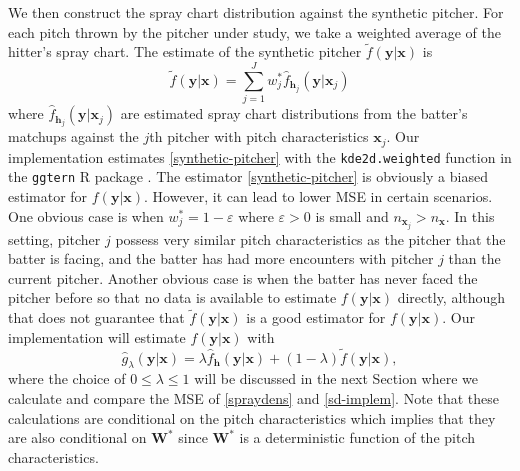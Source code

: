 \documentclass[11pt]{article}
\newcommand{\R}{\mathbb{R}}
\newcommand{\Xbf}{\textbf{X}}
\newcommand{\V}{\textbf{V}}
\newcommand{\W}{\textbf{W}}
\newcommand{\y}{\textbf{y}}
\newcommand{\x}{\textbf{x}}
\newcommand{\h}{\textbf{h}}
\newcommand{\Wstar}{\W^{\textstyle{*}}}
\newcommand{\wstar}{w^{\textstyle{*}}}
\begin{document}



We then construct the spray chart distribution against the synthetic pitcher. For each pitch thrown by the pitcher under study, we take a weighted average of the hitter's spray chart. The estimate of the synthetic pitcher $\tilde{f}(\y|\x)$ is  
\begin{equation} \label{synthetic-pitcher}
  \tilde{f}(\y|\x) = \sum_{j=1}^J \wstar_j\hat{f}_{\h_j}(\y|\x_j)
\end{equation}
where $\hat{f}_{\h_j}(\y|\x_j)$ are estimated spray chart distributions from the batter's matchups against the $j$th pitcher with pitch characteristics $\x_j$. Our implementation estimates \eqref{synthetic-pitcher} with the \texttt{kde2d.weighted} function in the \texttt{ggtern} R package \citep{ggtern}. The estimator \eqref{synthetic-pitcher} is obviously a biased estimator for $f(\y|\x)$. However, it can lead to lower MSE in certain scenarios. One obvious case is when $\wstar_j = 1 - \varepsilon$ where $\varepsilon > 0$ is small and $n_{\x_j} > n_{\x}$. In this setting, pitcher $j$ possess very similar pitch characteristics as the pitcher that the batter is facing, and the batter has had more encounters with pitcher $j$ than the current pitcher. Another obvious case is when the batter has never faced the pitcher before so that no data is available to estimate $f(\y|\x)$ directly, although that does not guarantee that $\tilde{f}(\y|\x)$ is a good estimator for $f(\y|\x)$. Our implementation will estimate $f(\y|\x)$ with
\begin{equation} \label{sd-implem}
  \hat{g}_{\lambda}(\y|\x) = \lambda \hat f_\h(\y|\x) + (1 - \lambda)\tilde{f}(\y|\x),
\end{equation}
where the choice of $0 \leq \lambda \leq 1$ will be discussed in the next Section where we  calculate and compare the MSE of \eqref{spraydens} and \eqref{sd-implem}. Note that these calculations are conditional on the pitch characteristics which implies that they are also conditional on $\Wstar$ since $\Wstar$ is a deterministic function of the pitch characteristics.
\end{document}
